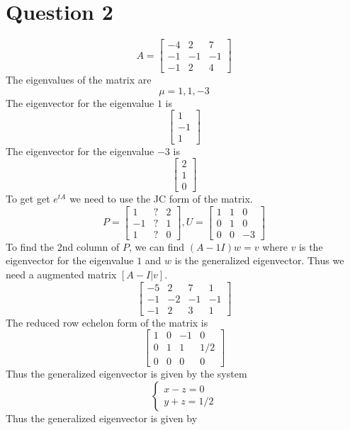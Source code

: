 \documentclass{article}
\begin{document}
\section*{Question 2}
$$A = \begin{bmatrix}
    -4 & 2 & 7\\
    -1 & -1 & -1\\
    -1 & 2 & 4
\end{bmatrix}$$
The eigenvalues of the matrix are 
$$\mu = 1, 1, -3 $$
The eigenvector for the eigenvalue $1$ is 
$$ \begin{bmatrix}
    1\\
    -1\\
    1
\end{bmatrix}$$
The eigenvector for the eigenvalue $-3$ is
$$ \begin{bmatrix}
    2\\
    1\\
    0
\end{bmatrix}$$
To get get $e^{tA}$ we need to use the JC form of the matrix. 
$$ P =  \begin{bmatrix}
    1 & ? & 2\\
    -1 & ? & 1\\
    1 & ? & 0
\end{bmatrix}, U = \begin{bmatrix}
    1 & 1 & 0\\
    0 & 1 & 0\\
    0 & 0 & -3
\end{bmatrix} $$
To find the 2nd column of $P$, we can find $(A - 1I)w = v$ where $v$ is the eigenvector for the eigenvalue $1$ and $w$ is the generalized eigenvector. Thus we need a augmented matrix $[A - I | v]$.
$$\begin{bmatrix}
    -5 & 2 & 7 & 1\\
    -1 & -2 & -1 & -1\\
    -1 & 2 & 3 & 1
\end{bmatrix}$$
The reduced row echelon form of the matrix is
$$\begin{bmatrix}
    1 & 0 & -1 & 0\\
    0 & 1 & 1 & 1/2\\
    0 & 0 & 0 & 0
\end{bmatrix}$$
Thus the generalized eigenvector is given by the system
$$\begin{cases}
    x - z = 0\\
    y + z = 1/2
\end{cases}$$
Thus the generalized eigenvector is given by
\end{document}
